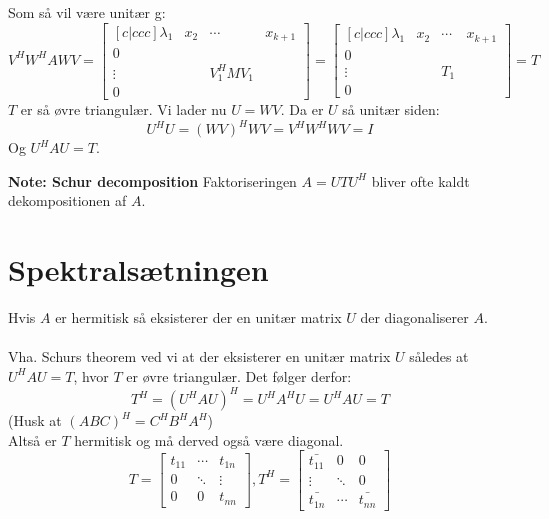 \documentclass[a4paper,oneside,article]{memoir}
\begin{document}
    Som så vil være unitær g:
    $$V^HW^HAWV=\begin{bmatrix}[c|ccc]
    	\lambda_1 & x_2 & \cdots & x_{k+1} \\ \hline
    	0 & & & \\
    	\vdots & & V_1^HMV_1 & \\
    	0 & & &
    	\end{bmatrix}=
    	\begin{bmatrix}[c|ccc]
   		\lambda_1 & x_2 & \cdots & x_{k+1} \\ \hline
   		0 & & & \\
   		\vdots & & T_1 & \\
   		0 & & &
   		\end{bmatrix}
   		=T$$
   	$T$ er så øvre triangulær. Vi lader nu $U=WV$. Da er 
   	$U$ så unitær siden:
   	$$U^HU=(WV)^HWV=V^HW^HWV=I$$
   	Og $U^HAU=T$.
   	
   	\textbf{Note: Schur decomposition}
   	Faktoriseringen $A=UTU^H$ bliver ofte kaldt 
   	dekompositionen af $A$.
   	
   	\section{Spektralsætningen}
   	Hvis $A$ er hermitisk så eksisterer der en unitær 
   	matrix $U$ der diagonaliserer $A$.
   	\\
   	\\
   	Vha. Schurs theorem ved vi at der eksisterer en
   	unitær matrix $U$ således at $U^HAU=T$, hvor $T$
   	er øvre triangulær. Det følger derfor:
   	$$T^H=(U^HAU)^H=U^HA^HU=U^HAU=T$$
   	(Husk at $(ABC)^H=C^HB^HA^H$)\\
   	Altså er $T$ hermitisk og må derved også være
   	diagonal.
   	$$T=\begin{bmatrix}
   	t_{11} & \cdots & t_{1n} \\
   	0 & \ddots & \vdots \\
   	0 & 0 & t_{nn}
   	\end{bmatrix},
   	T^H=\begin{bmatrix}
	   	\bar{t_{11}} & 0 & 0 \\
	   	\vdots & \ddots & 0 \\
	   	\bar{t_{1n}} & \cdots & \bar{t_{nn}}
	   	\end{bmatrix}$$
\end{document}
